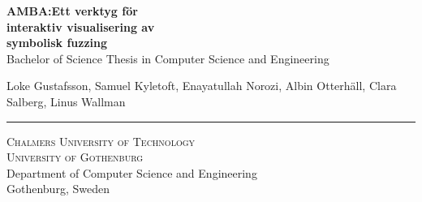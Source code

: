 
\mbox{}
\vfill
\textbf{{\Huge AMBA:\@ Ett verktyg för \\ interaktiv visualisering av \\ symbolisk fuzzing}} \\[0.5cm]
Bachelor of Science Thesis in Computer Science and Engineering \setlength{\parskip}{1cm}

\noindent
{\Large Loke Gustafsson, Samuel Kyletoft, Enayatullah Norozi, Albin Otterhäll,
    Clara Salberg, Linus Wallman} \setlength{\parskip}{1.5cm}


\rule{\textwidth}{1pt}
\textsc{Chalmers University of Technology} \\
\textsc{University of Gothenburg} \\
{\small Department of Computer Science and Engineering} \\
{\small Gothenburg, Sweden \the\year} \\
